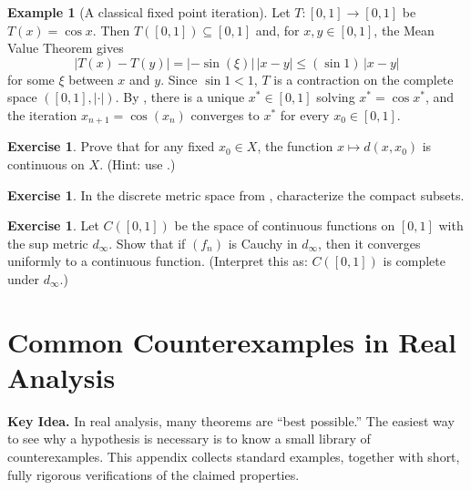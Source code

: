 \documentclass[12pt]{article}
\numberwithin{equation}{section}
\def\abs#1{|#1|}
\DeclarePairedDelimiter{\abs}{\lvert}{\rvert}
\theoremstyle{plain}
\theoremstyle{definition}
\newtheorem{example}[theorem]{Example}
\newtheorem{exercise}[theorem]{Exercise}
\theoremstyle{remark}
\newenvironment{keyidea}{\begin{tcolorbox}\textbf{Key Idea.}}{\end{tcolorbox}}
\begin{document}
\begin{example}[A classical fixed point iteration]\label{ms:ex:cos-fixed-point}
Let $T:[0,1]\to[0,1]$ be $T(x)=\cos x$.
Then $T([0,1])\subseteq[0,1]$ and, for $x,y\in[0,1]$, the Mean Value Theorem gives
\[
\abs{T(x)-T(y)}=\abs{-\sin(\xi)}\,\abs{x-y}\le (\sin 1)\,\abs{x-y}
\]
for some $\xi$ between $x$ and $y$. Since $\sin 1<1$, $T$ is a contraction on the complete space $([0,1],\abs{\cdot})$.
By , there is a unique $x^\ast\in[0,1]$ solving $x^\ast=\cos x^\ast$,
and the iteration $x_{n+1}=\cos(x_n)$ converges to $x^\ast$ for every $x_0\in[0,1]$.
\end{example}

\begin{exercise}
Prove that for any fixed $x_0\in X$, the function $x\mapsto d(x,x_0)$ is continuous on $X$.
(Hint: use .)
\end{exercise}

\begin{exercise}
In the discrete metric space from , characterize the compact subsets.
\end{exercise}

\begin{exercise}
Let $C([0,1])$ be the space of continuous functions on $[0,1]$ with the sup metric $d_\infty$.
Show that if $(f_n)$ is Cauchy in $d_\infty$, then it converges uniformly to a continuous function.
(Interpret this as: $C([0,1])$ is complete under $d_\infty$.)
\end{exercise}

\newpage



\appendix

\section{Common Counterexamples in Real Analysis}

\begin{keyidea}
In real analysis, many theorems are ``best possible.''  The easiest way to see why a hypothesis is necessary
is to know a small library of counterexamples.  This appendix collects standard examples,
together with short, fully rigorous verifications of the claimed properties.
\end{keyidea}

\end{document}

